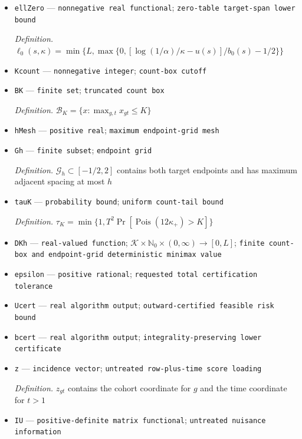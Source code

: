 \documentclass{article}
\begin{document}
\begin{itemize}
  \item \texttt{ellZero} --- \texttt{nonnegative real functional}; \texttt{zero-\allowbreak{}table target-\allowbreak{}span lower bound}
  \par\smallskip\noindent\emph{Definition.} \(\ell_0(s,\kappa)=\min\{L,\max\{0,[\log(1/\alpha)/\kappa-u(s)]/b_0(s)-1/2\}\}\)
  \item \texttt{Kcount} --- \texttt{nonnegative integer}; \texttt{count-\allowbreak{}box cutoff}
  \item \texttt{BK} --- \texttt{finite set}; \texttt{truncated count box}
  \par\smallskip\noindent\emph{Definition.} \(\mathcal B_K=\{x:\max_{g,t}x_{gt}\le K\}\)
  \item \texttt{hMesh} --- \texttt{positive real}; \texttt{maximum endpoint-\allowbreak{}grid mesh}
  \item \texttt{Gh} --- \texttt{finite subset}; \texttt{endpoint grid}
  \par\smallskip\noindent\emph{Definition.} \(\mathcal G_h\subset[-1/2,2]\) contains both target endpoints and has maximum adjacent spacing at most \(h\)
  \item \texttt{tauK} --- \texttt{probability bound}; \texttt{uniform count-\allowbreak{}tail bound}
  \par\smallskip\noindent\emph{Definition.} \(\tau_K=\min\{1,T^2\Pr[\operatorname{Pois}(12\kappa_+)>K]\}\)
  \item \texttt{DKh} --- \texttt{real-\allowbreak{}valued function}; \(\mathcal K\times\mathbb N_0\times(0,\infty)\to[0,L]\); \texttt{finite count-\allowbreak{}box and endpoint-\allowbreak{}grid deterministic minimax value}
  \item \texttt{epsilon} --- \texttt{positive rational}; \texttt{requested total certification tolerance}
  \item \texttt{Ucert} --- \texttt{real algorithm output}; \texttt{outward-\allowbreak{}certified feasible risk bound}
  \item \texttt{bcert} --- \texttt{real algorithm output}; \texttt{integrality-\allowbreak{}preserving lower certificate}
  \item \texttt{z} --- \texttt{incidence vector}; \texttt{untreated row-\allowbreak{}plus-\allowbreak{}time score loading}
  \par\smallskip\noindent\emph{Definition.} \(z_{gt}\) contains the cohort coordinate for \(g\) and the time coordinate for \(t>1\)
  \item \texttt{IU} --- \texttt{positive-\allowbreak{}definite matrix functional}; \texttt{untreated nuisance information}

\end{itemize}
\end{document}
